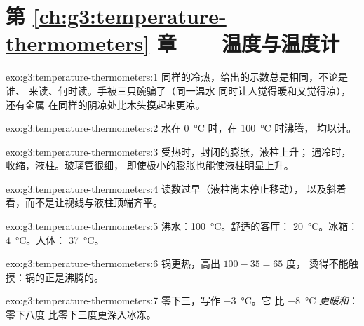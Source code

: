 \section*{第 \ref{ch:g3:temperature-thermometers} 章——温度与温度计}

\begin{solution}{exo:g3:temperature-thermometers:1}
同样的冷热，给出的示数总是相同，不论是谁、
来读、何时读。手被三只碗骗了（同一温水
同时让人觉得暖和又觉得凉），还有金属
在同样的阴凉处比木头摸起来更凉。
\end{solution}

\begin{solution}{exo:g3:temperature-thermometers:2}
水在 \qty{0}{\celsius} 时，在 \qty{100}{\celsius} 时沸腾，
均以计。
\end{solution}

\begin{solution}{exo:g3:temperature-thermometers:3}
受热时，封闭的膨胀，液柱上升；
遇冷时，收缩，液柱。玻璃管很细，
即使极小的膨胀也能使液柱明显上升。
\end{solution}

\begin{solution}{exo:g3:temperature-thermometers:4}
读数过早（液柱尚未停止移动），
以及斜着看，而不是让视线与液柱顶端齐平。
\end{solution}

\begin{solution}{exo:g3:temperature-thermometers:5}
沸水：\qty{100}{\celsius}。舒适的客厅：
\qty{20}{\celsius}。冰箱：\qty{4}{\celsius}。人体：
\qty{37}{\celsius}。
\end{solution}

\begin{solution}{exo:g3:temperature-thermometers:6}
锅更热，高出 $100 - 35 = 65$ 度，
烫得不能触摸：锅的正是沸腾的。
\end{solution}

\begin{solution}{exo:g3:temperature-thermometers:7}
零下三，写作 \qty{-3}{\celsius}。它
比 \qty{-8}{\celsius} \emph{更暖和}：零下八度
比零下三度更深入冰冻。
\end{solution}

